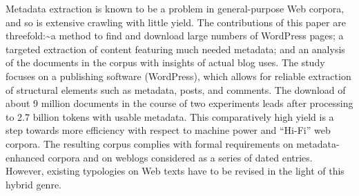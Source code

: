 Metadata extraction is known to be a problem in general-purpose Web corpora, and so is extensive crawling with little yield. The contributions of this paper are threefold:{\textasciitilde}a method to find and download large numbers of WordPress pages; a targeted extraction of content featuring much needed metadata; and an analysis of the documents in the corpus with insights of actual blog uses. The study focuses on a publishing software (WordPress), which allows for reliable extraction of structural elements such as metadata, posts, and comments. The download of about 9 million documents in the course of two experiments leads after processing to 2.7 billion tokens with usable metadata. This comparatively high yield is a step towards more efficiency with respect to machine power and ``Hi-Fi'' web corpora. The resulting corpus complies with formal requirements on metadata-enhanced corpora and on weblogs considered as a series of dated entries. However, existing typologies on Web texts have to be revised in the light of this hybrid genre.
